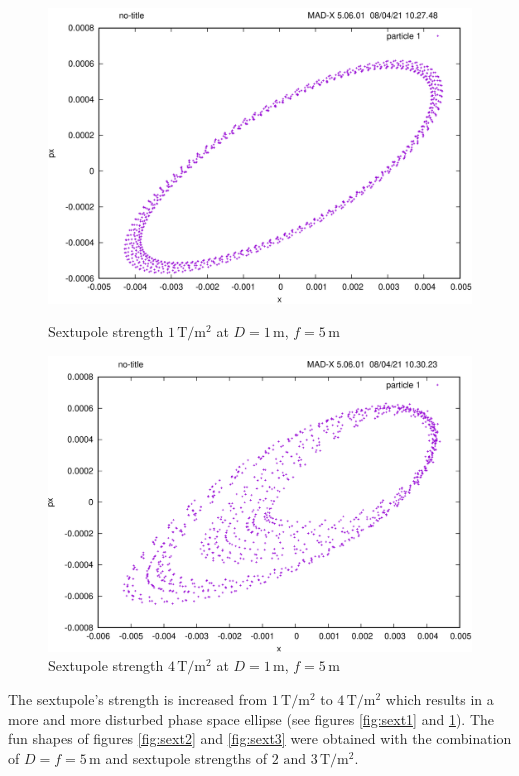 \begin{figure}[tbp]
    \centering
    \begin{minipage}{0.49\textwidth}
        \includegraphics[width=\textwidth]{../../part1/sext1.png}
        \caption{Sextupole strength $1\,\mathrm{T/m^2}$ at $D=1\,\mathrm{m}$, $f=5\,\mathrm{m}$}
        \label{fig:sext1}
    \end{minipage}\hfill
    \begin{minipage}{0.49\textwidth}
        \centering
        \includegraphics[width=\textwidth]{../../part1/sext4.png}
        \caption{Sextupole strength $4\,\mathrm{T/m^2}$ at $D=1\,\mathrm{m}$, $f=5\,\mathrm{m}$}
        \label{fig:sext4}
    \end{minipage}
\end{figure}

The sextupole's strength is increased from $1\,\mathrm{T/m^2}$ to $4\,\mathrm{T/m^2}$ which results in a more and more disturbed phase space ellipse (see figures \ref{fig:sext1} and \ref{fig:sext4}).
The fun shapes of figures \ref{fig:sext2} and \ref{fig:sext3} were obtained with the combination of $D=f=5\,\mathrm{m}$ and sextupole strengths of $2\text{ and }3\,\mathrm{T/m^2}$.

